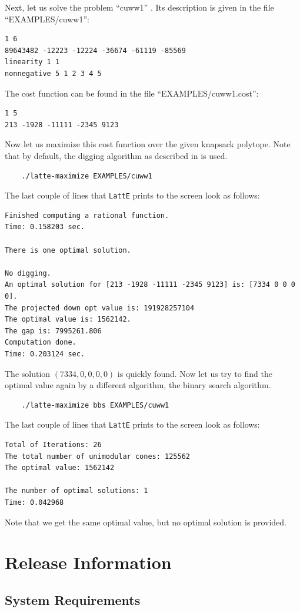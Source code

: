 \documentclass{article}
\begin{document}
Next, let us solve the problem ``cuww1'' \cite{cuww,latte3}. Its
description is given in the file ``EXAMPLES/cuww1'': 
\begin{verbatim}
1 6
89643482 -12223 -12224 -36674 -61119 -85569
linearity 1 1
nonnegative 5 1 2 3 4 5
\end{verbatim}
The cost function can be found in the file ``EXAMPLES/cuww1.cost'':
\begin{verbatim}
1 5
213 -1928 -11111 -2345 9123 
\end{verbatim}
Now let us maximize this cost function over the given knapsack
polytope. Note that by default, the digging algorithm as described in
\cite{latte3} is used.
\begin{verbatim}
    ./latte-maximize EXAMPLES/cuww1
\end{verbatim}
The last couple of lines that {\tt LattE} prints to the screen
look as follows:
{\small
\begin{verbatim}
Finished computing a rational function. 
Time: 0.158203 sec.

There is one optimal solution.          

No digging.
An optimal solution for [213 -1928 -11111 -2345 9123] is: [7334 0 0 0 0].
The projected down opt value is: 191928257104
The optimal value is: 1562142.
The gap is: 7995261.806
Computation done.
Time: 0.203124 sec.
\end{verbatim}
}
The solution $(7334,0,0,0,0)$ is quickly found. Now let us try to
find the optimal value again by a different algorithm, the binary
search algorithm.
\begin{verbatim}
    ./latte-maximize bbs EXAMPLES/cuww1
\end{verbatim}
The last couple of lines that {\tt LattE} prints to the screen
look as follows:
\begin{verbatim}
Total of Iterations: 26
The total number of unimodular cones: 125562
The optimal value: 1562142

The number of optimal solutions: 1
Time: 0.042968
\end{verbatim}
Note that we get the same optimal value, but no optimal solution is
provided.       
\section{Release Information}

\subsection{System Requirements}
\end{document}
